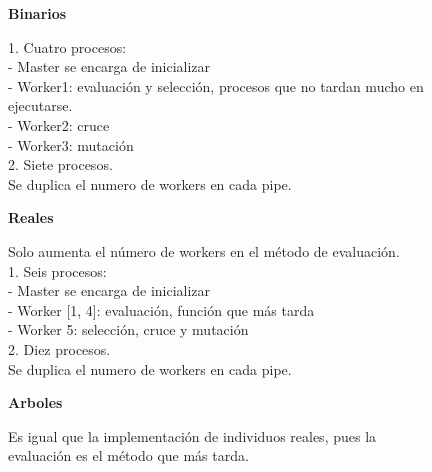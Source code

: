 \begin{figure}[!h]
	\begin{mdframed}[roundcorner=5pt]
		\textbf{Binarios}
		\vspace{-0.2cm}
		
		\begin{tcolorbox}[boxrule=0.5pt, fontupper=\small]
			\scriptsize		
			\color{darkgreen} 1. Cuatro procesos: \color{black}\\
			- Master se encarga de inicializar\\
			- Worker1: evaluación y selección, procesos que no tardan mucho en ejecutarse.\\
			- Worker2: cruce\\
			- Worker3: mutación\\
			
			\color{blue} 2. Siete procesos. \color{black}\\
			Se duplica el numero de workers en cada pipe.	
		\end{tcolorbox}
		
		\vspace{-0.5cm}
		\begin{flushleft}
			\textbf{Reales}
		\end{flushleft}
		\vspace{-0.7cm}
		
		\begin{tcolorbox}[boxrule=0.5pt, fontupper=\small]
			\scriptsize
			Solo aumenta el número de workers en el método de evaluación.\\
			\color{darkgreen} 1. Seis procesos: \color{black}\\
			- Master se encarga de inicializar\\
			- Worker [1, 4]: evaluación, función que más tarda\\
			- Worker 5:  selección, cruce y mutación\\	
			
			\color{blue} 2. Diez procesos. \color{black}\\
			Se duplica el numero de workers en cada pipe.	
		\end{tcolorbox}
		
		\vspace{-0.5cm}
		\begin{flushleft}
			\textbf{Arboles}
		\end{flushleft}
		\vspace{-0.4cm}
		Es igual que la implementación de individuos reales, pues la evaluación es el método que más tarda.
		
		
		
	\end{mdframed}
\end{figure}

